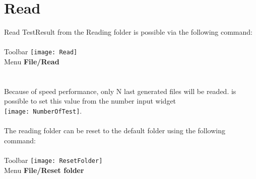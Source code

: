 \chapter{Read}

Read TestResult from the Reading folder is possible via the following command:
\\\\
Toolbar \textrightarrow \texttt{[image: Read]}\\
Menu \textrightarrow \textbf{File/Read}
\\\\\\
Because of speed performance, only N last generated files will be readed. is possible to set this value from the number input widget
\\
\texttt{[image: NumberOfTest]}.
\\\\
The reading folder can be reset to the default folder using the following command:
\\\\
Toolbar \textrightarrow \texttt{[image: ResetFolder]}\\
Menu \textrightarrow \textbf{File/Reset folder}

\clearpage